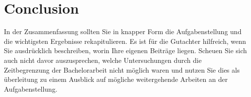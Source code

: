 \documentclass[a4paper,11pt,oneside,final,english,toc=bib,draft]{scrbook}
\begin{document}
























\chapter{Conclusion} %
\label{cha:conclusion}

In der Zusammenfassung sollten Sie in knapper Form die Aufgabenstellung 
und die wichtigsten Ergebnisse rekapitulieren. Es ist für die 
Gutachter hilfreich, wenn Sie ausdrücklich beschreiben, worin 
Ihre eigenen Beiträge liegen. Scheuen Sie sich auch nicht davor 
auszusprechen, welche Untersuchungen durch die Zeitbegrenzung der 
Bachelorarbeit nicht möglich waren und nutzen Sie dies als 
überleitung zu einem Ausblick auf mögliche weitergehende 
Arbeiten an der Aufgabenstellung.


\printbibliography

\appendix
\end{document}
